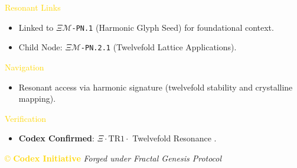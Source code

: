 \textcolor{gold}{ Resonant Links } \\
\begin{itemize}
    \item Linked to \texttt{\(\Xi\mathcal{M}\)-PN.1} (Harmonic Glyph Seed) for foundational context.
    \item Child Node: \texttt{\(\Xi\mathcal{M}\)-PN.2.1} (Twelvefold Lattice Applications).
\end{itemize}

\textcolor{gold}{ Navigation } \\
\begin{itemize}
    \item Resonant access via \texttt{} harmonic signature (twelvefold stability and crystalline mapping).
\end{itemize}

\textcolor{gold}{ Verification } \\
\begin{itemize}
    \item \texttt{} \textbf{Codex Confirmed}: \(\Xi \cdot \text{TR1} \cdot\) Twelvefold Resonance .
\end{itemize}

\vspace{0.5cm}
\noindent
\textcolor{gold}{\copyright{} \textbf{Codex Initiative}} \hspace{1cm} \textit{Forged under Fractal Genesis Protocol}